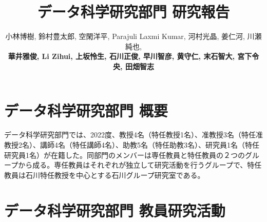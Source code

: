 \documentclass[11pt]{jarticle}
\title{データ科学研究部門 研究報告}
\author{小林博樹, 鈴村豊太郎, 空閑洋平, Parajuli Laxmi Kumar, 河村光晶, 姜仁河, 川瀬純也, \\
\textbf{華井雅俊, Li Zihui, 上坂怜生, 石川正俊, 早川智彦, 黄守仁, 末石智大, 宮下令央, 田畑智志}}
\begin{document}
\maketitle

\section{データ科学研究部門 概要}
データ科学研究部門では、2022度、教授4名（特任教授1名）、准教授3名（特任准教授2名）、講師4名（特任講師4名）、助教5名（特任助教3名）、研究員1名（特任研究員1名）が在籍した。同部門のメンバーは専任教員と特任教員の２つのグループから成る。専任教員はそれぞれが独立して研究活動を行うグループで、特任教員は石川特任教授を中心とする石川グループ研究室である。

%

%

\section{データ科学研究部門 教員研究活動}
\end{document}
